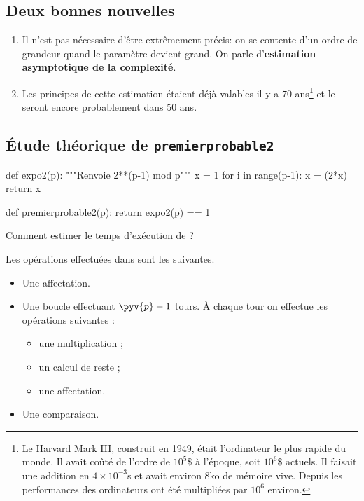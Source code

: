 \subsection{Deux bonnes nouvelles}

\begin{enumerate}
\item Il n'est pas nécessaire d'être extrêmement précis: on se
  contente d'un ordre de grandeur quand le paramètre devient grand. On
  parle d'\textbf{estimation asymptotique de la complexité}.
\item Les principes de cette estimation étaient déjà
  valables il y a $70$ ans\footnote{Le Harvard Mark III, construit en
    1949, était  l'ordinateur le plus rapide du
    monde. Il avait coûté de l'ordre de $10^{5}$\$ à l'époque, soit
    $10^{6}$\$ actuels. Il faisait une addition en $4\times 10^{-3}$s
    et avait environ $8$ko de mémoire vive. Depuis les performances
    des ordinateurs ont été multipliées par $10^{6}$ environ.} et le
  seront encore probablement dans $50$ ans.
\end{enumerate}

\subsection{Étude théorique de \texttt{premierprobable2}}

\begin{pyverbatim}
def expo2(p):
    """Renvoie 2**(p-1) mod p"""
    x = 1
    for i in range(p-1):
        x = (2*x) %
    return x  
    
def premierprobable2(p):
    return expo2(p) == 1
\end{pyverbatim}

Comment estimer le temps d'exécution de ?

Les opérations effectuées dans  sont les suivantes.
\begin{itemize}
\item[\textbullet] Une affectation.
\item[\textbullet] Une boucle effectuant $\pyv{p}-1$ tours. À chaque tour on
  effectue les opérations suivantes :
  \begin{itemize}
  \item une multiplication ;
  \item un calcul de reste ;
  \item une affectation.
  \end{itemize}
\item[\textbullet] Une comparaison.
\end{itemize}

